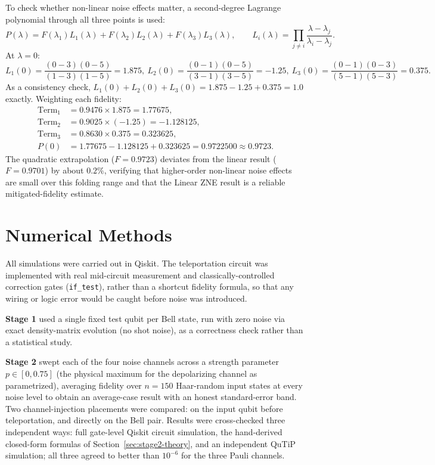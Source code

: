 \documentclass[11pt]{article}
\begin{document}
To check whether non-linear noise effects matter, a second-degree Lagrange polynomial through all three points is used:
\begin{equation}
P(\lambda) = F(\lambda_1)L_1(\lambda) + F(\lambda_2)L_2(\lambda) + F(\lambda_3)L_3(\lambda), \qquad L_i(\lambda)=\prod_{j\ne i}\frac{\lambda-\lambda_j}{\lambda_i-\lambda_j}.
\label{eq:lagrange}
\end{equation}
At $\lambda=0$:
\begin{equation}
L_1(0)=\frac{(0-3)(0-5)}{(1-3)(1-5)}=1.875,\
L_2(0)=\frac{(0-1)(0-5)}{(3-1)(3-5)}=-1.25,\
L_3(0)=\frac{(0-1)(0-3)}{(5-1)(5-3)}=0.375.
\label{eq:lagrange-coeffs}
\end{equation}
As a consistency check, $L_1(0)+L_2(0)+L_3(0)=1.875-1.25+0.375=1.0$ exactly. Weighting each fidelity:
\begin{align}
\text{Term}_1 &= 0.9476\times1.875 = 1.77675,\\
\text{Term}_2 &= 0.9025\times(-1.25) = -1.128125,\\
\text{Term}_3 &= 0.8630\times0.375 = 0.323625,\\
P(0) &= 1.77675 - 1.128125 + 0.323625 = 0.9722500 \approx \boxed{0.9723}.
\label{eq:quadratic-result}
\end{align}
The quadratic extrapolation ($F=0.9723$) deviates from the linear result ($F=0.9701$) by about $0.2\%$, verifying that higher-order non-linear noise effects are small over this folding range and that the Linear ZNE result is a reliable mitigated-fidelity estimate.

\section{Numerical Methods}
\label{sec:methods}

All simulations were carried out in Qiskit. The teleportation circuit was implemented with real mid-circuit measurement and classically-controlled correction gates (\texttt{if\_test}), rather than a shortcut fidelity formula, so that any wiring or logic error would be caught before noise was introduced.

\textbf{Stage 1} used a single fixed test qubit per Bell state, run with zero noise via exact density-matrix evolution (no shot noise), as a correctness check rather than a statistical study.

\textbf{Stage 2} swept each of the four noise channels across a strength parameter $p\in[0,0.75]$ (the physical maximum for the depolarizing channel as parametrized), averaging fidelity over $n=150$ Haar-random input states at every noise level to obtain an average-case result with an honest standard-error band. Two channel-injection placements were compared: on the input qubit before teleportation, and directly on the Bell pair. Results were cross-checked three independent ways: full gate-level Qiskit circuit simulation, the hand-derived closed-form formulas of Section~\ref{sec:stage2-theory}, and an independent QuTiP simulation; all three agreed to better than $10^{-6}$ for the three Pauli channels.
\end{document}
